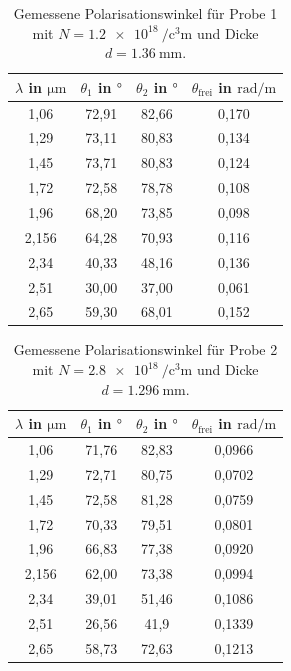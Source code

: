 \begin{table}[H]
    \centering
    \caption{Gemessene Polarisationswinkel für Probe 1 mit $N = \qty{1.2e18}{\per\cubic\centi\meter}$ und Dicke $d = \qty{1.36}{\milli\meter}$.}
    \label{tab:probe1}
    \begin{tabular}{c c c c}
        \toprule
        {$\lambda$ in $\si{\micro\meter}$} & {$\theta_1$ in $\si{\degree}$} & {$\theta_2$ in $\si{\degree}$} & {$\theta_\text{frei}$ in $\si{\radian\per\meter}$} \\
        \midrule
        1,06 & 72,91 & 82,66 & 0,170 \\
        1,29 & 73,11 & 80,83 & 0,134 \\
        1,45 & 73,71 & 80,83 & 0,124 \\ 
        1,72 & 72,58 & 78,78 & 0,108 \\ 
        1,96 & 68,20 & 73,85 & 0,098 \\
        2,156& 64,28 & 70,93 & 0,116 \\
        2,34 & 40,33 & 48,16 & 0,136 \\
        2,51 & 30,00 & 37,00 & 0,061 \\
        2,65 & 59,30 & 68,01 & 0,152 \\
        \bottomrule
    \end{tabular}
\end{table}

\begin{table}[H]
    \centering
    \caption{Gemessene Polarisationswinkel für Probe 2 mit $N = \qty{2.8e18}{\per\cubic\centi\meter}$ und Dicke $d = \qty{1.296}{\milli\meter}$.}
    \label{tab:probe2}
    \begin{tabular}{c c c c}
        \toprule
        {$\lambda$ in $\si{\micro\meter}$} & {$\theta_1$ in $\si{\degree}$} & {$\theta_2$ in $\si{\degree}$} & {$\theta_\text{frei}$ in $\si{\radian\per\meter}$} \\
        \midrule
        1,06 & 71,76 & 82,83 & 0,0966 \\
        1,29 & 72,71 & 80,75 & 0,0702 \\
        1,45 & 72,58 & 81,28 & 0,0759 \\
        1,72 & 70,33 & 79,51 & 0,0801 \\
        1,96 & 66,83 & 77,38 & 0,0920 \\
        2,156& 62,00 & 73,38 & 0,0994 \\
        2,34 & 39,01 & 51,46 & 0,1086 \\ 
        2,51 & 26,56 & 41,9  & 0,1339 \\
        2,65 & 58,73 & 72,63 & 0,1213 \\ 
        \bottomrule
    \end{tabular}
\end{table}


